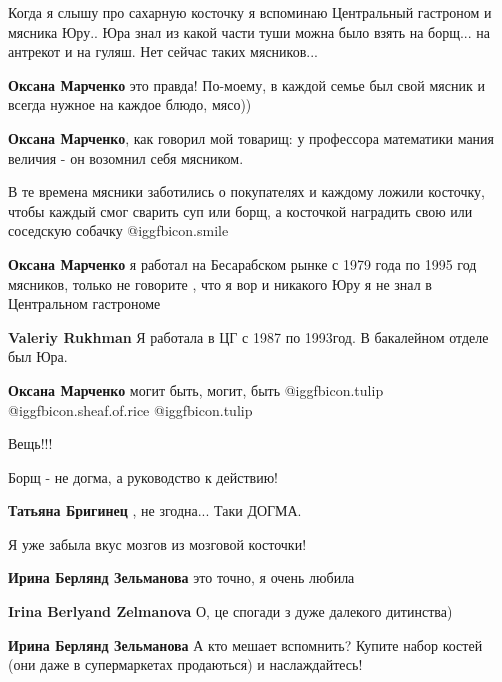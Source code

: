 \begin{itemize}

Когда я слышу про сахарную косточку я вспоминаю Центральный гастроном и мясника
Юру.. Юра знал из какой части туши можна было взять на борщ... на антрекот и на
гуляш. Нет сейчас таких мясников...

\begin{itemize} %
\textbf{Оксана Марченко} это правда! По-моему, в каждой семье был свой мясник и всегда нужное на каждое блюдо, мясо))

\textbf{Оксана Марченко}, как говорил мой товарищ: у профессора математики мания величия - он возомнил себя мясником.


В те времена мясники заботились о покупателях и каждому ложили косточку, чтобы
каждый смог сварить суп или борщ, а косточкой наградить свою или соседскую
собачку  @igg{fbicon.smile} 


\textbf{Оксана Марченко} я работал на Бесарабском рынке с 1979 года по 1995 год мясников, только не говорите , что я вор и никакого Юру я не знал в Центральном гастрономе

\begin{itemize} %
\textbf{Valeriy Rukhman} Я работала в ЦГ с 1987 по 1993год. В бакалейном отделе был Юра.

\textbf{Оксана Марченко} могит быть, могит, быть  @igg{fbicon.tulip}  @igg{fbicon.sheaf.of.rice}  @igg{fbicon.tulip} 
\end{itemize} %

\end{itemize} %

Вещь!!!

Борщ - не догма, а руководство к действию!

\textbf{Татьяна Бригинец} , не згодна... Таки ДОГМА.

Я уже забыла вкус мозгов из мозговой косточки!

\begin{itemize} %
\textbf{Ирина Берлянд Зельманова} это точно, я очень любила

\textbf{Irina Berlyand Zelmanova}
О, це спогади з дуже далекого дитинства)

\textbf{Ирина Берлянд Зельманова} А кто мешает вспомнить? Купите набор костей (они даже в супермаркетах продаються) и наслаждайтесь!


\end{itemize}
\end{itemize}
